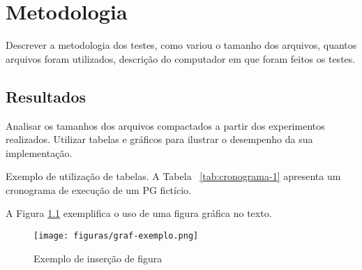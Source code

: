 \chapter{Metodologia}

Descrever a metodologia dos testes, como variou o tamanho dos arquivos, quantos arquivos foram utilizados, descrição do computador em que foram feitos os testes.

\section{Resultados}

Analisar os tamanhos dos arquivos compactados a partir dos experimentos realizados. Utilizar tabelas e gráficos para ilustrar o desempenho da sua implementação.

Exemplo de utilização de tabelas.  A Tabela ~\ref{tab:cronograma-1} apresenta um cronograma de execução de um PG fictício.


\begin{table}[htb]
	\centering
	\caption{Cronograma de Atividades do primeiro semestre.}
	\label{tab:cronograma-1}
\end{table}


A Figura \ref{fig:graf} exemplifica o uso de uma figura gráfica no texto.


   \begin{figure}[!htb]
    \centering
   	\texttt{[image: figuras/graf-exemplo.png]}
   	\caption{Exemplo de inserção de figura}
   	\label{fig:graf}
   \end{figure}
